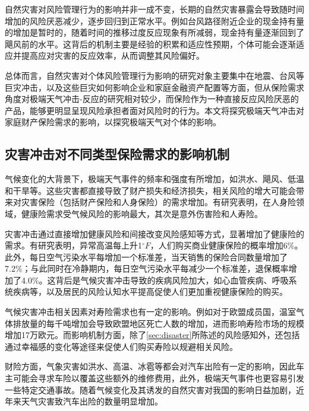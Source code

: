 自然灾害对风险管理行为的影响并非一成不变，长期的自然灾害暴露会导致随时间增加的风险厌恶减少，逐步回归到正常水平\citep{cheong2022natural,ingwersen2023evolution}。例如台风路径附近企业的现金持有量的增加是暂时的，随着时间的推移过度反应现象有所减弱，现金持有量逐渐回到了飓风前的水平\citep{shao2024typhoons,0Do}。这背后的机制主要是经验的积累和适应性预期，个体可能会逐渐适应并提高应对灾害的反应效率，从而调整其风险偏好\citep{0Do}。

总体而言，自然灾害对个体风险管理行为影响的研究对象主要集中在地震、台风等巨灾冲击，以及这些巨灾如何影响企业和家庭金融资产配置等方面，但从保险需求角度对极端天气冲击-反应的研究相对较少，而保险作为一种直接反应风险厌恶的产品，能够更明显呈现风险承担者面对风险时的行为。本文将探究极端天气冲击对家庭财产保险需求的影响，以探究极端天气对个体的影响。

\subsection{灾害冲击对不同类型保险需求的影响机制}

气候变化的大背景下，极端天气事件的频率和强度有所增加，如洪水、飓风、低温和干旱等\citep{blazey2007financial}。这些灾害都直接导致了财产损失和经济损失，相关风险的增大可能会带来对灾害保险（包括财产保险和人身保险）的需求增加。有研究表明，在人身险领域，健康险需求受气候风险的影响最大，其次是意外伤害险和人寿险\citep{JRPL202302005}。

灾害冲击通过直接增加健康风险和间接改变风险感知等方式，显著增加了健康险的需求。有研究表明，异常高温每上升1$^\circ F$，人们购买商业健康保险的概率增加6\%\citep{zhong2022exposure}。此外，每日空气污染水平每增加一个标准差，当天销售的保险合同数量增加了7.2\%；与此同时在冷静期内，每日空气污染水平每减少一个标准差，退保概率增加了4.0\%\citep{2018Something}。这背后是气候灾害冲击导致的疾病风险加大，如心血管疾病、呼吸系统疾病等\citep{aitken2022climate,brown2008climate}，以及居民的风险认知水平提高\citep{1021776338.nh}促使人们更加重视健康保险的购买。

气候灾害冲击相关因素对寿险需求也有一定的影响。例如对于欧盟成员国，温室气体排放量的每千吨增加会导致欧盟地区死亡人数的增加，进而影响寿险市场的规模增加17万欧元\citep{melnychenko2021influence}。而影响机制方面，除了\ref{sec:disaster}所陈述的风险感知外，还包括通过幸福感的变化等途径来促使人们购买寿险以规避相关风险\citep{avdeenko2021impact}。

财险方面，气象灾害如洪水、高温、冰雹等都会对汽车出险有一定的影响，因此车主可能会寻求车险以覆盖这些额外的维修费用\citep{changnon1997effects,xu2014climate}，此外，极端天气事件也更容易引发一些特定交通事故\citep{吴建平2008交通事故与天气气候关系分析}。随着气候变化及其诱发的自然灾害对我国的影响日益加剧，近年来天气灾害致汽车出险的数量明显增加\citep{张翠华2020天气灾害致车险理赔的风险分析}。

